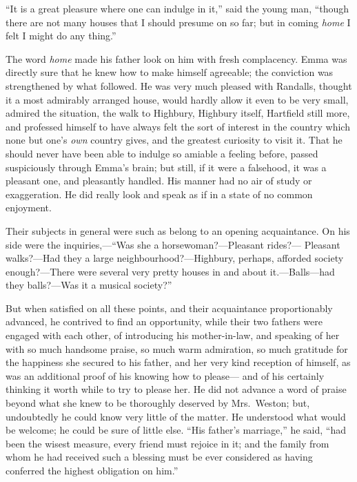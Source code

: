 ``It is a great pleasure where one can indulge in it,'' said the young man,
``though there are not many houses that I should presume on so far;
but in coming \emph{home} I felt I might do any thing.''

The word \emph{home} made his father look on him with fresh complacency.
Emma was directly sure that he knew how to make himself agreeable;
the conviction was strengthened by what followed.  He was very much
pleased with Randalls, thought it a most admirably arranged house,
would hardly allow it even to be very small, admired the situation,
the walk to Highbury, Highbury itself, Hartfield still more,
and professed himself to have always felt the sort of interest
in the country which none but one's \emph{own} country gives, and the
greatest curiosity to visit it.  That he should never have been
able to indulge so amiable a feeling before, passed suspiciously
through Emma's brain; but still, if it were a falsehood, it was a
pleasant one, and pleasantly handled.  His manner had no air of study
or exaggeration.  He did really look and speak as if in a state of no
common enjoyment.

Their subjects in general were such as belong to an opening acquaintance.
On his side were the inquiries,---``Was she a horsewoman?---Pleasant rides?---%
Pleasant walks?---Had they a large neighbourhood?---Highbury, perhaps,
afforded society enough?---There were several very pretty houses
in and about it.---Balls---had they balls?---Was it a musical society?''

But when satisfied on all these points, and their acquaintance
proportionably advanced, he contrived to find an opportunity,
while their two fathers were engaged with each other, of introducing
his mother-in-law, and speaking of her with so much handsome praise,
so much warm admiration, so much gratitude for the happiness she
secured to his father, and her very kind reception of himself,
as was an additional proof of his knowing how to please---%
and of his certainly thinking it worth while to try to please her.
He did not advance a word of praise beyond what she knew to be
thoroughly deserved by Mrs.\ Weston; but, undoubtedly he could know
very little of the matter.  He understood what would be welcome;
he could be sure of little else.  ``His father's marriage,'' he said,
``had been the wisest measure, every friend must rejoice in it;
and the family from whom he had received such a blessing must
be ever considered as having conferred the highest obligation
on him.''

